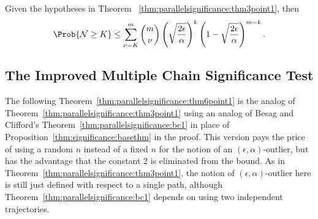 \documentclass[12pt]{article}
\begin{document}
\begin{corollary}
    Given the hypotheses in Theorem~%
    \ref{thm:parallelsignificance:thm3point1}, then
    \[
        \Prob{\mathcal{N} \ge K} \le \sum\limits_{\nu=K}^m \binom{m}{\nu}
        \left( \sqrt{\frac{2\epsilon}{\alpha}} \right)^{k} \left( 1 -
        \sqrt{\frac{2\epsilon}{\alpha}} \right)^{m-k}.
    \]
\end{corollary}

\subsection*{The Improved Multiple Chain Significance Test}

The following Theorem~\ref{thm:parallelsignificance:thm6point1} is the analog of
Theorem~\ref{thm:parallelsignificance:thm3point1} using an analog of Besag and Clifford's Theorem~\ref{thm:parallelsignificance:bc1} in
place of Proposition~\ref{thm:significance:basethm} in the proof. This version pays the price of using a
random \( n \) instead of a fixed \( n \) for the notion of an \(
(\epsilon, \alpha) \)-outlier,
but has the advantage that the constant \( 2 \) is eliminated from
the bound. As in Theorem~\ref{thm:parallelsignificance:thm3point1},
the notion of \( (\epsilon, \alpha) \)-outlier here is still just defined with respect to a single
path, although Theorem~\ref{thm:parallelsignificance:bc1} depends on using two independent
trajectories.
\end{document}
